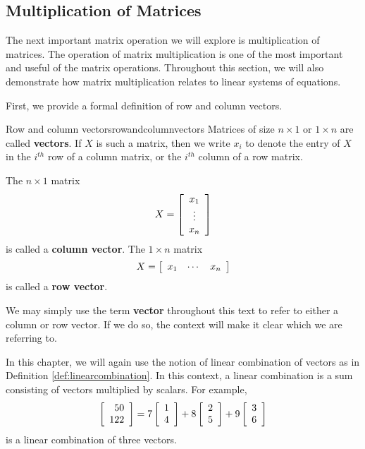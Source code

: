\subsection{Multiplication of Matrices}

The next important matrix operation we will explore is multiplication
of matrices. The
operation of matrix multiplication is one of the most important and
useful of the matrix operations.  Throughout this section, we will
also demonstrate how matrix multiplication relates to linear systems
of equations.

First, we provide a formal definition of row and column vectors. 

\begin{definition}{Row and column vectors}{rowandcolumnvectors}
Matrices of size $n\times 1$ or $1\times n$ are called \textbf{vectors}. If $X$ is such a matrix, then we write $x_{i}$ to 
denote the entry of $X$ in the $i^{th}$ row of a column matrix, or the $i^{th}$ column of a row matrix. 


The $n\times 1$ matrix
\begin{equation*}
X=\left[
\begin{array}{c}
x_{1} \\
\vdots \\
x_{n}
\end{array}
\right]
\end{equation*}
is called
a \textbf{column vector}.
The $1\times n$ matrix
\begin{equation*}
X = \left[
\begin{array}{ccc}
x_{1} & \cdots & x_{n}
\end{array}
\right]
\end{equation*}
is called a \textbf{row vector}.
\end{definition}

We may simply use the term \textbf{vector} throughout this text to refer to either a column or row vector. 
If we do so, the context will make it clear which we are referring to.

In this chapter, we will again use the notion of linear combination of
vectors as in  Definition \ref{def:linearcombination}.  In this context, a linear combination is a sum
consisting of vectors multiplied by scalars.  For example,
\begin{equation*}
\left[
\begin{array}{r}
50 \\
122
\end{array}
\right]
=
7\left[
\begin{array}{r}
1 \\
4
\end{array}
\right] +8\left[
\begin{array}{r}
2 \\
5
\end{array}
\right] +9\left[
\begin{array}{r}
3 \\
6
\end{array}
\right]
\end{equation*}
is a linear combination of three vectors. 

